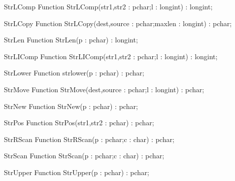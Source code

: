  
\begin{function}{StrLComp}
\Declaration
Function StrLComp(str1,str2 : pchar;l : longint) : longint;
\Description
\Errors
\SeeAlso
\end{function}

 
\begin{function}{StrLCopy}
\Declaration
Function StrLCopy(dest,source : pchar;maxlen : longint) : pchar;
\Description
\Errors
\SeeAlso
\end{function}

 
\begin{function}{StrLen}
\Declaration
Function StrLen(p : pchar) : longint;
\Description
\Errors
\SeeAlso
\end{function}

 
\begin{function}{StrLIComp}
\Declaration
Function StrLIComp(str1,str2 : pchar;l : longint) : longint;
\Description
\Errors
\SeeAlso
\end{function}

 
\begin{function}{StrLower}
\Declaration
Function strlower(p : pchar) : pchar;
\Description
\Errors
\SeeAlso
\end{function}

 
\begin{function}{StrMove}
\Declaration
Function StrMove(dest,source : pchar;l : longint) : pchar;
\Description
\Errors
\SeeAlso
\end{function}

 
\begin{function}{StrNew}
\Declaration
Function StrNew(p : pchar) : pchar;
\Description
\Errors
\SeeAlso
\end{function}

 
\begin{function}{StrPos}
\Declaration
Function StrPos(str1,str2 : pchar) : pchar;
\Description
\Errors
\SeeAlso
\end{function}

 
\begin{function}{StrRScan}
\Declaration
Function StrRScan(p : pchar;c : char) : pchar;
\Description
\Errors
\SeeAlso
\end{function}

 
\begin{function}{StrScan}
\Declaration
Function StrScan(p : pchar;c : char) : pchar;
\Description
\Errors
\SeeAlso
\end{function}

 
\begin{function}{StrUpper}
\Declaration
Function StrUpper(p : pchar) : pchar;
\Description
\Errors
\SeeAlso
\end{function}

